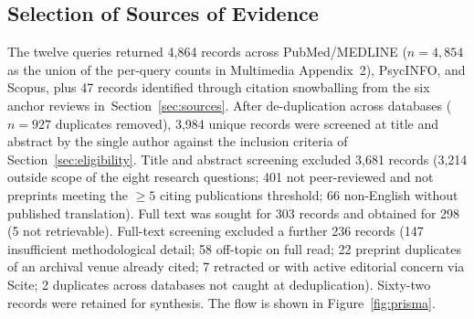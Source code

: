 \documentclass[11pt,a4paper]{article}
\newcommand{\secref}[1]{Section~\ref{#1}}
\newcommand{\figref}[1]{Figure~\ref{#1}}
\begin{document}
\subsection{Selection of Sources of Evidence}\label{sec:selection}

The twelve queries returned 4{,}864 records across PubMed/MEDLINE
($n\!=\!4{,}854$ as the union of the per-query counts in Multimedia
Appendix~2), PsycINFO, and Scopus, plus 47 records identified
through citation snowballing from the six anchor reviews
in~\secref{sec:sources}. After de-duplication across databases
($n\!=\!927$ duplicates removed), 3{,}984 unique records were
screened at title and abstract by the single author against the
inclusion criteria of \secref{sec:eligibility}. Title and abstract
screening excluded 3{,}681 records (3{,}214 outside scope of the
eight research questions; 401 not peer-reviewed and not preprints
meeting the $\ge\!5$ citing publications threshold; 66 non-English
without published translation). Full text was sought for 303
records and obtained for 298 (5 not retrievable). Full-text
screening excluded a further 236 records (147 insufficient
methodological detail; 58 off-topic on full read; 22 preprint
duplicates of an archival venue already cited; 7 retracted or with
active editorial concern via Scite; 2 duplicates across databases
not caught at deduplication). Sixty-two records were retained for
synthesis. The flow is shown in \figref{fig:prisma}.
\end{document}

